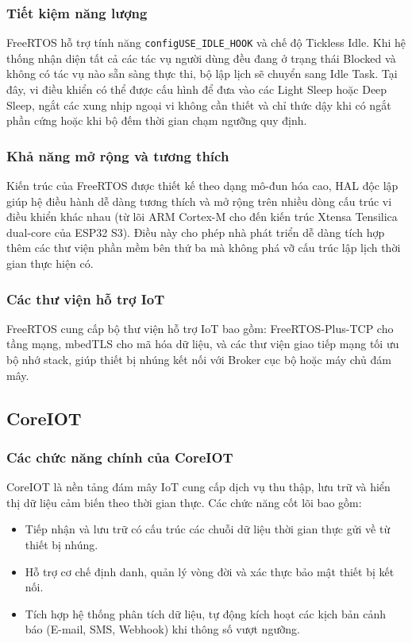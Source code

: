 \subsubsection{Tiết kiệm năng lượng}
FreeRTOS hỗ trợ tính năng \texttt{configUSE\_IDLE\_HOOK} và chế độ Tickless Idle. Khi hệ thống nhận diện tất cả các tác vụ người dùng đều đang ở trạng thái Blocked và không có tác vụ nào sẵn sàng thực thi, bộ lập lịch sẽ chuyển sang Idle Task. Tại đây, vi điều khiển có thể được cấu hình để đưa vào các Light Sleep hoặc Deep Sleep, ngắt các xung nhịp ngoại vi không cần thiết và chỉ thức dậy khi có ngắt phần cứng hoặc khi bộ đếm thời gian chạm ngưỡng quy định.

\subsubsection{Khả năng mở rộng và tương thích}
Kiến trúc của FreeRTOS được thiết kế theo dạng mô-đun hóa cao, HAL độc lập giúp hệ điều hành dễ dàng tương thích và mở rộng trên nhiều dòng cấu trúc vi điều khiển khác nhau (từ lõi ARM Cortex-M cho đến kiến trúc Xtensa Tensilica dual-core của ESP32 S3). Điều này cho phép nhà phát triển dễ dàng tích hợp thêm các thư viện phần mềm bên thứ ba mà không phá vỡ cấu trúc lập lịch thời gian thực hiện có.

\subsubsection{Các thư viện hỗ trợ IoT}
FreeRTOS cung cấp bộ thư viện hỗ trợ IoT bao gồm: FreeRTOS-Plus-TCP cho tầng mạng, mbedTLS cho mã hóa dữ liệu, và các thư viện giao tiếp mạng tối ưu bộ nhớ stack, giúp thiết bị nhúng kết nối với Broker cục bộ hoặc máy chủ đám mây.

\subsection{CoreIOT}

\subsubsection{Các chức năng chính của CoreIOT}
CoreIOT là nền tảng đám mây IoT cung cấp dịch vụ thu thập, lưu trữ và hiển thị dữ liệu cảm biến theo thời gian thực. Các chức năng cốt lõi bao gồm:
\begin{itemize}
    \item Tiếp nhận và lưu trữ có cấu trúc các chuỗi dữ liệu thời gian thực gửi về từ thiết bị nhúng.
    \item Hỗ trợ cơ chế định danh, quản lý vòng đời và xác thực bảo mật thiết bị kết nối.
    \item Tích hợp hệ thống phân tích dữ liệu, tự động kích hoạt các kịch bản cảnh báo (E-mail, SMS, Webhook) khi thông số vượt ngưỡng.
\end{itemize}

